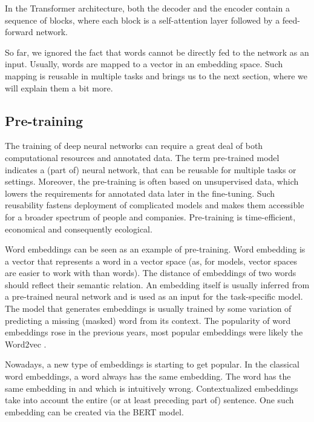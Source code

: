 In the Transformer architecture, both the decoder and the encoder contain a sequence of blocks, where each block is a self-attention layer followed by a feed-forward network. 

So far, we ignored the fact that words cannot be directly fed to the network as an input. Usually, words are mapped to a vector in an embedding space. Such mapping is reusable in multiple tasks and brings us to the next section, where we will explain them a bit more.
 
\subsection{Pre-training}

The training of deep neural networks can require a great deal of both computational resources and annotated data. The term pre-trained model indicates a (part of) neural network, that can be reusable for multiple tasks or settings. Moreover, the pre-training is often based on unsupervised data, which lowers the requirements for annotated data later in the fine-tuning. Such reusability fastens deployment of complicated models and makes them accessible for a broader spectrum of people and companies. Pre-training is time-efficient, economical and consequently ecological.

Word embeddings can be seen as an example of pre-training. Word embedding is a vector that represents a word in a vector space (as, for models, vector spaces are easier to work with than words). The distance of embeddings of two words should reflect their semantic relation. An embedding itself is usually inferred from a pre-trained neural network and is used as an input for the task-specific model. The model that generates embeddings is usually trained by some variation of predicting a missing (masked) word from its context. The popularity of word embeddings rose in the previous years, most popular embeddings were likely the Word2vec \cite{mikolov2013word2vec}.  

Nowadays, a new type of embeddings is starting to get popular. In the classical word embeddings, a word always has the same embedding. The word  has the same embedding in  and  which is intuitively wrong. Contextualized embeddings take into account the entire (or at least preceding part of) sentence. One such embedding can be created via the BERT model.

